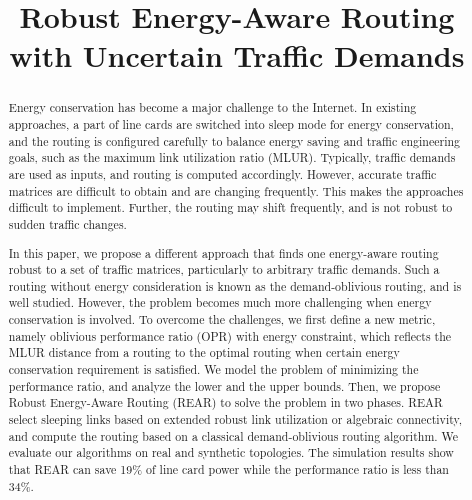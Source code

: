 \documentclass[conference]{IEEEtran}
\begin{document}
\title{Robust Energy-Aware Routing with Uncertain Traffic Demands}


\author{
\and
{}
\and
{}
}


\maketitle

\begin{abstract}
Energy conservation has become a major challenge to the Internet. In existing approaches, a part of line cards 
are switched into sleep mode for energy conservation, and the routing is configured carefully to balance energy saving 
and traffic engineering goals, such as the maximum link utilization ratio (MLUR). Typically, traffic demands are 
used as inputs, and routing is computed accordingly. However, accurate traffic matrices are difficult to obtain and 
are changing frequently. This makes the approaches difficult to implement. Further, the routing may shift 
frequently, and is not robust to sudden traffic changes.

In this paper, we propose a different approach that finds one energy-aware routing robust to a set of traffic 
matrices, particularly to arbitrary traffic demands. Such a routing without energy consideration is known as 
the demand-oblivious routing, and is well studied. However, the problem becomes much more challenging when energy 
conservation is involved. To overcome the challenges, we first define a new metric, namely oblivious performance 
ratio (OPR) with energy constraint, which reflects the MLUR distance from a routing to the optimal routing when 
certain energy conservation requirement is satisfied. We model the problem of minimizing the performance ratio, 
and analyze the lower and the upper bounds. Then, we propose Robust Energy-Aware Routing (REAR) to solve 
the problem in two phases. REAR select sleeping links based on extended robust link utilization or algebraic 
connectivity, and compute the routing based on a classical demand-oblivious routing algorithm. 
We evaluate our algorithms on real and synthetic topologies. The simulation results show that REAR can save 
19\% of line card power while the performance ratio is less than 34\%.
\end{abstract}
\end{document}
